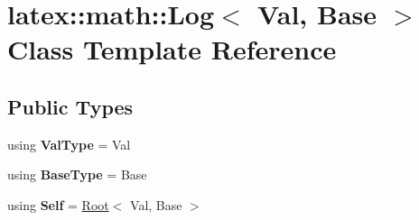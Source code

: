 \hypertarget{classlatex_1_1math_1_1Log}{\section{latex\-:\-:math\-:\-:Log$<$ Val, Base $>$ Class Template Reference}
\label{classlatex_1_1math_1_1Log}
}
\subsection*{Public Types}
\begin{DoxyCompactItemize}
\item 
\hypertarget{classlatex_1_1math_1_1Log_aa32f8cb4db5de995babab3db3d9f8e81}{using {\bfseries Val\-Type} = Val}\label{classlatex_1_1math_1_1Log_aa32f8cb4db5de995babab3db3d9f8e81}

\item 
\hypertarget{classlatex_1_1math_1_1Log_abd32480183653f3053bf162119bb325c}{using {\bfseries Base\-Type} = Base}\label{classlatex_1_1math_1_1Log_abd32480183653f3053bf162119bb325c}

\item 
\hypertarget{classlatex_1_1math_1_1Log_acf39054abefed7c8683323377080d28d}{using {\bfseries Self} = \hyperlink{classlatex_1_1math_1_1Root}{Root}$<$ Val, Base $>$}\label{classlatex_1_1math_1_1Log_acf39054abefed7c8683323377080d28d}

\end{DoxyCompactItemize}
